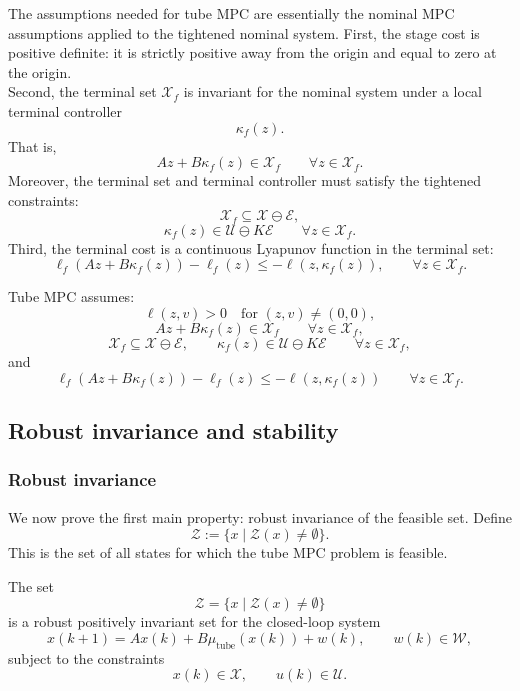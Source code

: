The assumptions needed for tube MPC are essentially the nominal MPC assumptions applied to
the tightened nominal system. First, the stage cost is positive definite: it is strictly positive
away from the origin and equal to zero at the origin.\\

Second, the terminal set \(\mathcal X_f\) is invariant for the nominal system under a local
terminal controller
\[
    \kappa_f(z).
\]
That is,
\[
    Az+B\kappa_f(z)\in\mathcal X_f
    \qquad
    \forall z\in\mathcal X_f.
\]
Moreover, the terminal set and terminal controller must satisfy the tightened constraints:
\[
    \mathcal X_f\subseteq\mathcal X\ominus\mathcal E,
\]
\[
    \kappa_f(z)\in\mathcal U\ominus K\mathcal E
    \qquad
    \forall z\in\mathcal X_f.
\]
Third, the terminal cost is a continuous Lyapunov function in the terminal set:
\[
    \ell_f(Az+B\kappa_f(z))-\ell_f(z)
    \leq
    -\ell(z,\kappa_f(z)),
    \qquad
    \forall z\in\mathcal X_f.
\]

\begin{theorembox}
Tube MPC assumes:
\[
    \ell(z,v)>0
    \quad \text{for } (z,v)\neq(0,0),
\]
\[
    Az+B\kappa_f(z)\in\mathcal X_f
    \qquad
    \forall z\in\mathcal X_f,
\]
\[
    \mathcal X_f\subseteq\mathcal X\ominus\mathcal E,
    \qquad
    \kappa_f(z)\in\mathcal U\ominus K\mathcal E
    \qquad
    \forall z\in\mathcal X_f,
\]
and
\[
    \ell_f(Az+B\kappa_f(z))-\ell_f(z)
    \leq
    -\ell(z,\kappa_f(z))
    \qquad
    \forall z\in\mathcal X_f.
\]
\end{theorembox}

\subsection{Robust invariance and stability}

\subsubsection{Robust invariance}

We now prove the first main property: robust invariance of the feasible set. Define
\[
    \mathcal Z
    :=
    \{x\mid \mathcal Z(x)\neq\emptyset\}.
\]
This is the set of all states for which the tube MPC problem is feasible.

\begin{theorembox}
The set
\[
    \mathcal Z=\{x\mid \mathcal Z(x)\neq\emptyset\}
\]
is a robust positively invariant set for the closed-loop system
\[
    x(k+1)=Ax(k)+B\mu_{\mathrm{tube}}(x(k))+w(k),
    \qquad
    w(k)\in\mathcal W,
\]
subject to the constraints
\[
    x(k)\in\mathcal X,
    \qquad
    u(k)\in\mathcal U.
\]
\end{theorembox}

